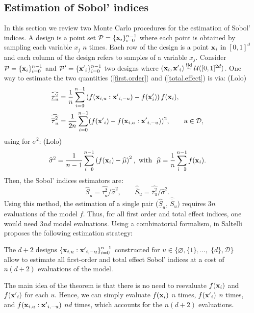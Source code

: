 \subsection{Estimation of Sobol' indices}
\label{sec:2.2}
In this section we review two Monte Carlo procedures for the estimation of Sobol' indices. A design is a point set $\mathcal{P}=\{\boldsymbol{\mathbf{x}}_i\}_{i=0}^{n-1}$ where each point is obtained by sampling each variable $x_j$ $n$ times. Each row of the design is a point $\boldsymbol{\mathbf{x}}_i$ in $[0,1]^d$ and each column of the design refers to samples of a variable $x_j$. Consider $\mathcal{P}=\{\boldsymbol{\mathbf{x}}_i\}_{i=0}^{n-1}$ and $\mathcal{P'}=\{{\boldsymbol{\mathbf{x}}'}_i\}_{i=0}^{n-1}$ two designs where $(\boldsymbol{\mathbf{x}}_i,{\boldsymbol{\mathbf{x}}'}_i) \stackrel{{\rm iid}}{\sim} \mathcal{U}([0,1]^{2d})$. One way to estimate the two quantities (\ref{first.order}) and (\ref{total.effect}) is via:
{\color{purple}(Lolo)
\begin{align}
\label{first.order.est}
\widehat{\underline{\tau}_u^2} &= \frac{1}{n} \sum \limits_{i=0}^{n-1} \left(f(\vx_{i,u}:{\vx'}_{i,-u})-f(\vx'_i)\right)f(\vx_i),\\
\label{total.effect.est}
\widehat{\ov{$\tau$}_u^2} &= \frac{1}{2n} \sum \limits_{i=0}^{n-1} (f({\vx'}_i) - f(\vx_{i,u}:{\vx'}_{i,-u}))^2, \qquad u \in \mathcal{D},
\end{align}
}
using for $\sigma^2$:
{\color{purple} (Lolo)
\begin{equation}
 \widehat{\sigma}^2 = \frac{1}{n-1} \sum \limits_{i=0}^{n-1} \left( f(\boldsymbol{\mathbf{x}}_i) - \widehat{\mu}\right)^2, \text{ with } \ \widehat{\mu} =  \frac{1}{n} \sum \limits_{i=0}^{n-1} f(\boldsymbol{\mathbf{x}}_i).
\label{mu.est}
\end{equation}
}
Then, the Sobol' indices estimators are:
\begin{equation}
\widehat{\underline{S}}_u = \widehat{\underline{\tau}_u^2} / \widehat{\sigma}^2, \qquad
\widehat{\overline{S}}_u = \widehat{\overline{\tau}_u^2} / \widehat{\sigma}^2.
\label{common.sobol.est}
\end{equation}
Using this method, the estimation of a single pair ($\widehat{\underline{S}}_u$, $\widehat{\overline{S}}_u$) requires $3n$ evaluations of the model $f$. Thus, for all first order and total effect indices, one would need $3nd$ model evaluations. Using a combinatorial formalism, in \cite{Saltelli} Saltelli proposes the following estimation strategy:
\begin{theorem}
\label{saltelli.theorem}
The $d+2$ designs $\{\boldsymbol{\mathbf{x}}_{i,u}:{\boldsymbol{\mathbf{x}}'}_{i,-u}\}_{i=0}^{n-1}$ constructed for $u \in \{\varnothing,\{1\},\dots,$ $\{d\},\mathcal{D}\}$ allow to estimate all first-order and total effect Sobol' indices at a cost of $n(d+2)$ evaluations of the model.
\end{theorem}
The main idea of the theorem is that there is no need to reevaluate $f({\boldsymbol{\mathbf{x}}}_i)$ and $f({\boldsymbol{\mathbf{x}}'}_i)$ for each $u$. Hence, we can simply evaluate $f({\boldsymbol{\mathbf{x}}}_i)$ $n$ times, $f({\boldsymbol{\mathbf{x}}'}_i)$ $n$ times, and $f(\boldsymbol{\mathbf{x}}_{i,u}:{\boldsymbol{\mathbf{x}}'}_{i,-u})$ $nd$ times, which accounts for the $n(d+2)$ evaluations.

